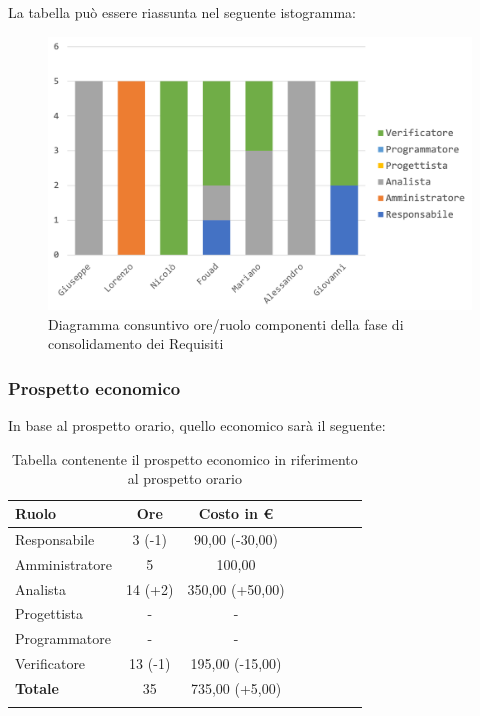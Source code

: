 			La tabella può essere riassunta nel seguente istogramma:
			
			\begin{figure}[H]
				\centering
				\includegraphics[width=0.8\linewidth]{images/consuntivo/ConsReqCons.png}
				\caption{Diagramma consuntivo ore/ruolo componenti della fase di consolidamento dei Requisiti}
				\label{fig:consuntivo diagramma suddivisione ruoli fase di consolidamento dei requisiti}
			\end{figure}
			
		\subsubsection{Prospetto economico}
			In base al prospetto orario, quello economico sarà il seguente: 
			
			\begin{longtable}{|l|c|c|c|c|c|c|c|}
				\hline
				\rowcolor{lighter-grayer}
				\textbf{Ruolo} & \textbf{Ore} & \textbf{Costo in €} \\
				\hline
				\endfirsthead
				
				\hline
				Responsabile & 3 (-1) & 90,00 (-30,00)\\
				\hline
				\hline
				Amministratore & 5 & 100,00\\
				\hline
				\hline
				Analista & 14 (+2) & 350,00 (+50,00)\\
				\hline
				\hline
				Progettista & - & -\\
				\hline
				\hline
				Programmatore & -  & -\\
				\hline
				\hline
				Verificatore & 13 (-1) & 195,00 (-15,00)\\
				\hline
				\textbf{Totale} & 35 & 735,00 (+5,00)\\
				\hline
				\caption{Tabella contenente il prospetto economico in riferimento al prospetto orario}
			\end{longtable}
			
